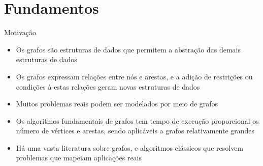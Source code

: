 \section{Fundamentos}

\begin{frame}[fragile]{Motivação}

    \begin{itemize}
        \item Os grafos são estruturas de dados que permitem a abstração das demais estruturas
            de dados

        \item Os grafos expressam relações entre nós e arestas, e a adição de restrições ou
            condições à estas relações geram novas estruturas de dados

        \item Muitos problemas reais podem ser modelados por meio de grafos

        \item Os algoritmos fundamentais de grafos tem tempo de execução proporcional os número
            de vértices e arestas, sendo aplicáveis a grafos relativamente grandes

        \item Há uma vasta literatura sobre grafos, e algoritmos clássicos que resolvem
            problemas que mapeiam aplicações reais

    \end{itemize}

\end{frame}

